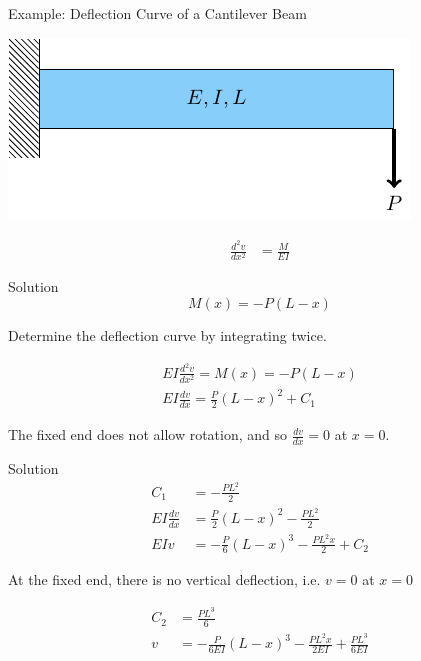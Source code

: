 \documentclass[10pt, svgnames]{beamer}
\begin{document}
\begin{frame}[label={sec:org7e0fc83}]{Example: Deflection Curve of a Cantilever Beam}
\begin{center}
\includegraphics[width=.9\linewidth]{pictures/deflection-curve-example.pdf}
\end{center}

\begin{align*}
    \frac{d^{2}v}{dx^{2}} &= \frac{M}{EI}
\end{align*}
\end{frame}

\begin{frame}[label={sec:org0dc992b}]{Solution}
\[M(x) =  - P(L - x)\]

Determine the deflection curve by integrating twice.

\begin{gather*}
  EI\frac{d^2v}{dx^2} = M(x) =  - P(L - x) \\
  EI\frac{dv}{dx} = \frac{P}{2}(L - x)^2 + C_1
\end{gather*}

The fixed end does not allow rotation, and so \(\frac{dv}{dx} = 0\) at
\(x = 0\).
\end{frame}

\begin{frame}[label={sec:org26f1da0}]{Solution}
\begin{align*}
  C_1 &=  - \frac{PL^2}{2} \\
  EI\frac{dv}{dx} &= \frac{P}{2}(L - x)^2 - \frac{PL^2}{2} \\
  EIv &=  - \frac{P}{6}{(L - x)^3} - \frac{PL^2x}{2} + C_2
\end{align*}

At the fixed end, there is no vertical deflection, i.e. \(v = 0\) at
\(x = 0\)

\begin{align*}
  C_2 &= \frac{PL^3}{6} \\
  v &=  - \frac{P}{6EI}(L - x)^3 - \frac{PL^2x}{2EI} + \frac{PL^3}{6EI}
\end{align*}
\end{frame}
\end{document}
